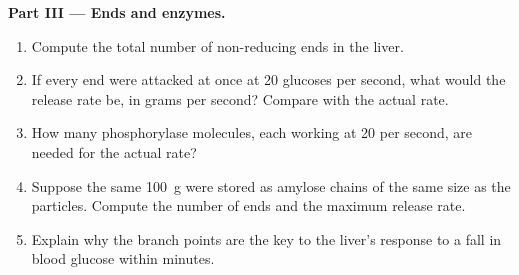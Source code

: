 \begin{problem}
\medskip
\noindent\textbf{Part III --- Ends and enzymes.}
\begin{enumerate}[resume]
  \item Compute the total number of non-reducing ends in the liver.
  \item If every end were attacked at once at \qty{20}{} glucoses per
        second, what would the release rate be, in grams per second?
        Compare with the actual rate.
  \item How many phosphorylase molecules, each working at \qty{20}{}
        per second, are needed for the actual rate?
  \item Suppose the same \qty{100}{g} were stored as amylose chains
        of the same size as the particles. Compute the number of ends
        and the maximum release rate.
  \item Explain why the branch points are the key to the liver's
        response to a fall in blood glucose within minutes.
\end{enumerate}


\end{problem}
